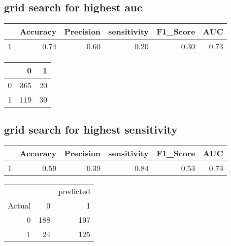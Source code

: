 \documentclass{article}
\begin{document}
\subsection{grid search for highest auc}
\begin{table}[ht]
\centering
\begin{tabular}{rrrrrr}
  \hline
 & Accuracy & Precision & sensitivity & F1\_Score & AUC \\ 
  \hline
1 & 0.74 & 0.60 & 0.20 & 0.30 & 0.73 \\ 
   \hline
\end{tabular}
\end{table}
\begin{table}[ht]
\centering
\begin{tabular}{rrr}
  \hline
 & 0 & 1 \\ 
  \hline
0 & 365 &  20 \\ 
  1 & 119 &  30 \\ 
   \hline
\end{tabular}
\end{table}


\newpage
\subsection{grid search for highest sensitivity}
\begin{table}[ht]
\centering
\begin{tabular}{rrrrrr}
  \hline
 & Accuracy & Precision & sensitivity & F1\_Score & AUC \\ 
  \hline
1 & 0.59 & 0.39 & 0.84 & 0.53 & 0.73 \\ 
   \hline
\end{tabular}
\end{table}

\begin{table}[ht]
\centering
\begin{tabular}{rrr}
\hline 
& & predicted
  \\Actual
 & 0 & 1 \\ 
  \hline
0 & 188 & 197 \\ 
  1 &  24 & 125 \\ 
   \hline
\end{tabular}
\end{table}
\end{document}
